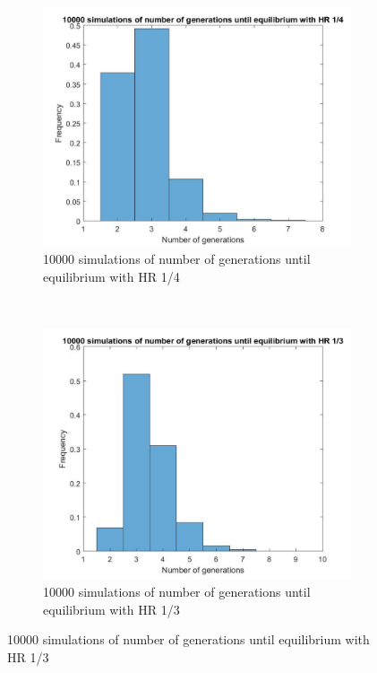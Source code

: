 \begin{figure}[H]
    \centering
    \begin{subfigure}{0.45\textwidth}
        \includegraphics[width=\textwidth]{GenormHistogramAantalgen4.pdf}
        \caption{10000 simulations of number of generations until equilibrium with HR 1/4}
        \label{hist hap 1/4}
    \end{subfigure}
	~
    \begin{subfigure}{0.45\textwidth}
        \includegraphics[width=\textwidth]{GenormHistogramAantalgen.pdf}
        \caption{10000 simulations of number of generations until equilibrium with HR 1/3}

\end{subfigure}
\end{figure}
